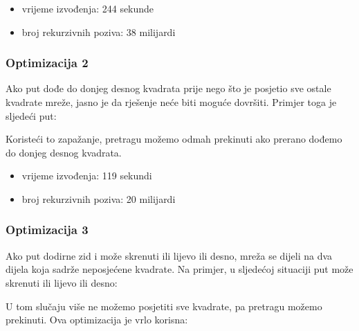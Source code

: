 \begin{itemize}
\item
vrijeme izvođenja: 244 sekunde
\item
broj rekurzivnih poziva: 38 milijardi
\end{itemize}

\subsubsection{Optimizacija 2}

Ako put dođe do donjeg desnog kvadrata
prije nego što je posjetio sve ostale kvadrate mreže,
jasno je da
rješenje neće biti moguće dovršiti.
Primjer toga je sljedeći put:

\begin{center}
\end{center}
Koristeći to zapažanje, pretragu možemo odmah prekinuti
ako prerano dođemo do donjeg desnog kvadrata.
\begin{itemize}
\item
vrijeme izvođenja: 119 sekundi
\item
broj rekurzivnih poziva: 20 milijardi
\end{itemize}

\subsubsection{Optimizacija 3}

Ako put dodirne zid
i može skrenuti ili lijevo ili desno,
mreža se dijeli na dva dijela
koja sadrže neposjećene kvadrate.
Na primjer, u sljedećoj situaciji
put može skrenuti ili lijevo ili desno:

\begin{center}
\end{center}
U tom slučaju više ne možemo posjetiti sve kvadrate,
pa pretragu možemo prekinuti.
Ova optimizacija je vrlo korisna:

